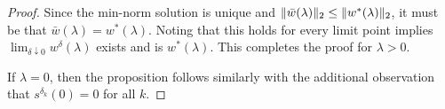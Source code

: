 \begin{proof}
    Since the min-norm solution is unique and
    \( \|\bar w(\lambda)\|_2 \leq \|w^*(\lambda)\|_2 \),
    it must be that \( \bar w(\lambda) = w^*(\lambda) \).
    Noting that this holds for every limit point implies
    \( \lim_{\delta \downarrow 0} w^{\delta}(\lambda) \) exists and is \( w^*(\lambda) \).
    This completes the proof for \( \lambda > 0 \).

    If \( \lambda = 0 \), then the proposition follows similarly with
    the additional observation that \( s^{\delta_k}(0) = 0 \)
    for all \( k \).
\end{proof}

